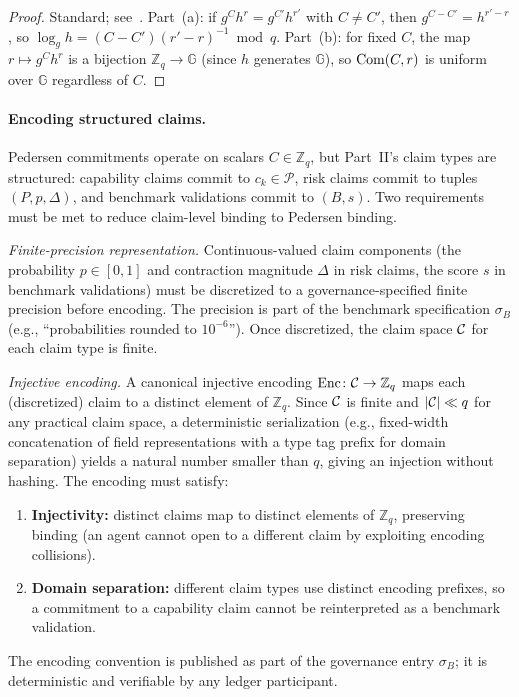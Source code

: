 \begin{proof}
Standard; see~\citet{pedersen1992non}.  Part~(a): if $g^C h^r = g^{C'}
h^{r'}$ with $C \neq C'$, then $g^{C - C'} = h^{r' - r}$, so $\log_g
h = (C - C')(r' - r)^{-1} \bmod q$.  Part~(b): for fixed $C$, the map
$r \mapsto g^C h^r$ is a bijection $\mathbb{Z}_q \to \mathbb{G}$
(since $h$ generates $\mathbb{G}$), so $\mathrm{Com}(C, r)$ is uniform over
$\mathbb{G}$ regardless of $C$.
\end{proof}

\paragraph{Encoding structured claims.}
Pedersen commitments operate on scalars $C \in \mathbb{Z}_q$, but
Part~II's claim types are structured: capability claims commit to
$c_k \in \mathcal{P}$, risk claims commit to tuples $(P, p, \Delta)$,
and benchmark validations commit to $(B, s)$.  Two requirements must be
met to reduce claim-level binding to Pedersen binding.

\emph{Finite-precision representation.}  Continuous-valued claim
components (the probability $p \in [0,1]$ and contraction magnitude
$\Delta$ in risk claims, the score $s$ in benchmark validations) must
be discretized to a governance-specified finite precision before
encoding.  The precision is part of the benchmark specification
$\sigma_B$ (e.g., ``probabilities rounded to $10^{-6}$'').  Once
discretized, the claim space $\mathcal{C}$ for each claim type is finite.

\emph{Injective encoding.}  A canonical injective encoding
$\mathrm{Enc} \colon \mathcal{C} \to \mathbb{Z}_q$ maps each (discretized)
claim to a distinct element of $\mathbb{Z}_q$.  Since $\mathcal{C}$ is
finite and $|\mathcal{C}| \ll q$ for any practical claim space, a
deterministic serialization (e.g., fixed-width concatenation of
field representations with a type tag prefix for domain separation)
yields a natural number smaller than $q$, giving an injection
without hashing.  The encoding must satisfy:
\begin{enumerate}
    \item \textbf{Injectivity:}  distinct claims map to distinct
    elements of $\mathbb{Z}_q$, preserving binding (an agent cannot
    open to a different claim by exploiting encoding collisions).
    \item \textbf{Domain separation:}  different claim types use
    distinct encoding prefixes, so a commitment to a capability claim
    cannot be reinterpreted as a benchmark validation.
\end{enumerate}
The encoding convention is published as part of the governance entry
$\sigma_B$; it is deterministic and verifiable by any ledger
participant.

